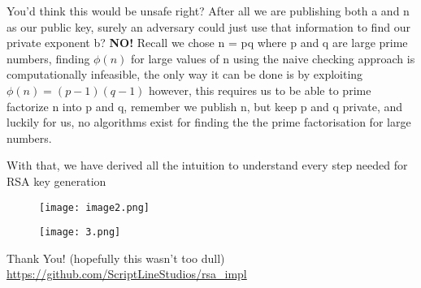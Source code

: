\documentclass[aspectratio=169]{beamer}
\begin{document}
\begin{frame}
    \begin{center}
        You'd think this would be unsafe right? After all we are publishing both a and n as our public key, surely an adversary could just use that information to find our private exponent b?
        \textbf{NO!}
        Recall we chose n = pq where p and q are large prime numbers, finding $\phi(n)$ for large values of n using the naive checking approach is computationally infeasible, the only way it can be done is by exploiting $\phi(n) = (p-1)(q-1)$ however, this requires us to be able to prime factorize n into p and q, remember we publish n, but keep p and q private, and luckily for us, no algorithms exist for finding the the prime factorisation for large numbers.
    \end{center}
\end{frame}

\begin{frame}
    \begin{center}
        With that, we have derived all the intuition to understand every step needed for RSA key generation
        \begin{figure}
            \centering
            \texttt{[image: image2.png]}
            \label{fig:enter-label}
        \end{figure}
    \end{center}
\end{frame}

\begin{frame}
    \begin{center}
    \begin{figure}
        \centering
        \texttt{[image: 3.png]}
        \label{fig:enter-label}
    \end{figure}
    \end{center}
\end{frame}

\begin{frame}
    \begin{center}
        Thank You! (hopefully this wasn't too dull)
        \url{https://github.com/ScriptLineStudios/rsa_impl}
    \end{center}
\end{frame}
\end{document}
